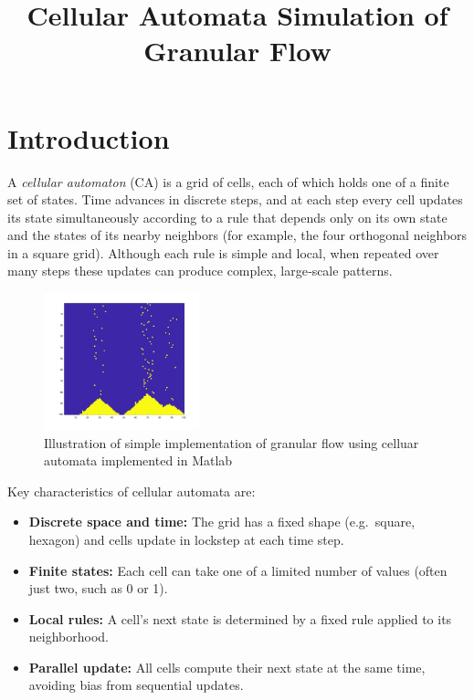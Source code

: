 \documentclass{article}
\title{Cellular Automata Simulation of Granular Flow}
\begin{document}
\maketitle

\section{Introduction}

A \emph{cellular automaton} (CA) is a grid of cells, each of which holds one of a finite set of states. Time advances in discrete steps, and at each step every cell updates its state simultaneously according to a rule that depends only on its own state and the states of its nearby neighbors (for example, the four orthogonal neighbors in a square grid). Although each rule is simple and local, when repeated over many steps these updates can produce complex, large‑scale patterns.

\begin{figure}[htbp]
  \centering
  \includegraphics[width=0.4\textwidth]{projects/granular_flow/images/sand.png}
  \caption{Illustration of simple implementation of granular flow using celluar automata implemented in Matlab}
  \label{fig:allee-effects}
\end{figure}


Key characteristics of cellular automata are:
\begin{itemize}
  \item \textbf{Discrete space and time:} The grid has a fixed shape (e.g.\ square, hexagon) and cells update in lockstep at each time step.
  \item \textbf{Finite states:} Each cell can take one of a limited number of values (often just two, such as 0 or 1).
  \item \textbf{Local rules:} A cell’s next state is determined by a fixed rule applied to its neighborhood.
  \item \textbf{Parallel update:} All cells compute their next state at the same time, avoiding bias from sequential updates.
\end{itemize}
\end{document}
